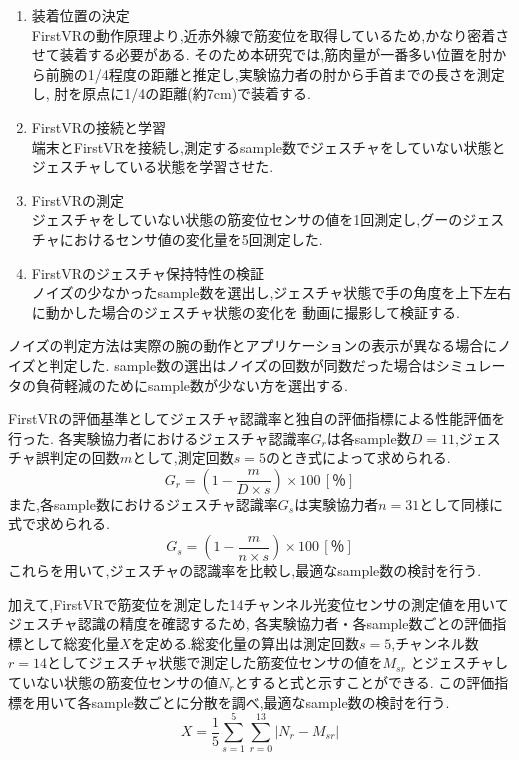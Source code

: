 \documentclass{ltjsreport}
\begin{document}
		\begin{enumerate}
			\item 装着位置の決定\\
				FirstVRの動作原理より,近赤外線で筋変位を取得しているため,かなり密着させて装着する必要がある.
				そのため本研究では,筋肉量が一番多い位置を肘から前腕の1/4程度の距離と推定し,実験協力者の肘から手首までの長さを測定し,
				肘を原点に1/4の距離(約7cm)で装着する.
			\item FirstVRの接続と学習\\
				端末とFirstVRを接続し,測定するsample数でジェスチャをしていない状態とジェスチャしている状態を学習させた.
			\item FirstVRの測定\\
				ジェスチャをしていない状態の筋変位センサの値を1回測定し,グーのジェスチャにおけるセンサ値の変化量を5回測定した.
			\item FirstVRのジェスチャ保持特性の検証\\
				ノイズの少なかったsample数を選出し,ジェスチャ状態で手の角度を上下左右に動かした場合のジェスチャ状態の変化を
				動画に撮影して検証する.
		\end{enumerate}

		ノイズの判定方法は実際の腕の動作とアプリケーションの表示が異なる場合にノイズと判定した.
		sample数の選出はノイズの回数が同数だった場合はシミュレータの負荷軽減のためにsample数が少ない方を選出する.

		FirstVRの評価基準としてジェスチャ認識率と独自の評価指標による性能評価を行った.
		各実験協力者におけるジェスチャ認識率$G_{r}$は各sample数$D = 11$,ジェスチャ誤判定の回数$m$として,測定回数$s = 5$のとき式によって求められる.
		\begin{equation}
			\label{eq:gestureprobability1}
			G_{r} = \left( 1-\frac{m}{D \times s} \right) \times 100 \, [％]
		\end{equation}
		また,各sample数におけるジェスチャ認識率$G_{s}$は実験協力者$n = 31$として同様に式で求められる.
		\begin{equation}
			\label{eq:gestureprobability2}
			G_{s} = \left( 1-\frac{m}{n \times s} \right) \times 100 \, [％]
		\end{equation}
		これらを用いて,ジェスチャの認識率を比較し,最適なsample数の検討を行う.
		
		加えて,FirstVRで筋変位を測定した14チャンネル光変位センサの測定値を用いてジェスチャ認識の精度を確認するため,
		各実験協力者・各sample数ごとの評価指標として総変化量$X$を定める.総変化量の算出は測定回数$s = 5$,チャンネル数$r = 14$としてジェスチャ状態で測定した筋変位センサの値を$M_{{s}{r}}$
		とジェスチャしていない状態の筋変位センサの値$N_{r}$とすると式と示すことができる.
		この評価指標を用いて各sample数ごとに分散を調べ,最適なsample数の検討を行う.
		\begin{equation}
			\label{eq:originaldata}
			X = \frac{1}{5} \sum_{s = 1}^{5} \sum_{r = 0}^{13} |N_{r} - M_{{s}{r}}|
		\end{equation}
		
\end{document}
